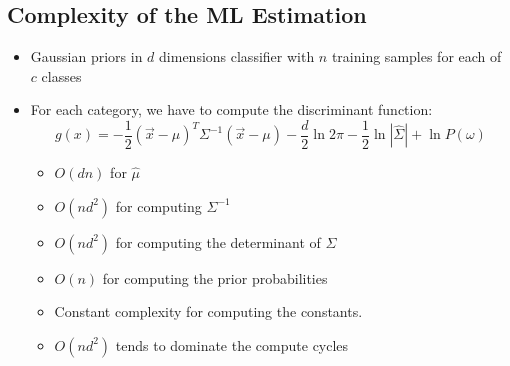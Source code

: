 \documentclass[11pt]{article}
\begin{document}
\subsection{Complexity of the ML Estimation}
\begin{itemize}
	\item Gaussian priors in $d$ dimensions classifier with $n$ training samples for each of $c$ classes 
	\item For each category, we have to compute the discriminant function:
	\begin{equation}
		g(x) = - \frac{1}{2} ( \vec{x} - \mu) ^T  \Sigma^{-1} ( \vec{x} - \mu) - \frac{d}{2}\ln {2\pi} - \frac{1}{2} \ln|\hat{\Sigma} | + \ln P(\omega)
	\end{equation}
	\begin{itemize}
		\item $O(d n)$ for $\hat{\mu}$ 
		\item $O(n d^2)$ for computing $\Sigma ^{-1}$ 
		\item $O(nd^2)$ for computing the determinant of $\Sigma$
		\item $O(n)$ for computing the prior probabilities
		\item Constant complexity for computing the constants.
		\item $O(n d^2)$ tends to dominate the compute cycles 
	\end{itemize}
	
	
\end{itemize}
\end{document}
